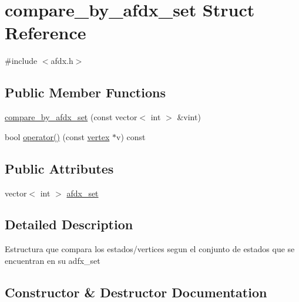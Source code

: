 \hypertarget{structcompare__by__afdx__set}{}\section{compare\+\_\+by\+\_\+afdx\+\_\+set Struct Reference}
\label{structcompare__by__afdx__set}


{\ttfamily \#include $<$afdx.\+h$>$}

\subsection*{Public Member Functions}
\begin{DoxyCompactItemize}
\item 
\hyperlink{structcompare__by__afdx__set_a404c69dd4633a16ebdf06e317ef1f952}{compare\+\_\+by\+\_\+afdx\+\_\+set} (const vector$<$ int $>$ \&vint)
\item 
bool \hyperlink{structcompare__by__afdx__set_a18fa08904cc5f451f09d177d1dae9cdb}{operator()} (const \hyperlink{structvertex}{vertex} $\ast$v) const
\end{DoxyCompactItemize}
\subsection*{Public Attributes}
\begin{DoxyCompactItemize}
\item 
vector$<$ int $>$ \hyperlink{structcompare__by__afdx__set_a1e8f179c48ce4510d346cbde1f7c2a6f}{afdx\+\_\+set}
\end{DoxyCompactItemize}


\subsection{Detailed Description}
Estructura que compara los estados/vertices segun el conjunto de estados que se encuentran en su adfx\+\_\+set 

\subsection{Constructor \& Destructor Documentation}
\hypertarget{structcompare__by__afdx__set_a404c69dd4633a16ebdf06e317ef1f952}{}\label{structcompare__by__afdx__set_a404c69dd4633a16ebdf06e317ef1f952} 
